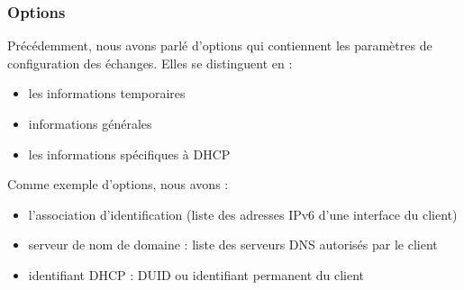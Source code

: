\subsubsection{Options}

Précédemment, nous avons parlé d’options qui contiennent les paramètres de configuration des échanges.  
Elles se distinguent en : 

\begin{itemize}
	\item les informations temporaires
	\item  informations générales
	\item les informations spécifiques à DHCP
\end{itemize}

Comme exemple d’options, nous avons :

\begin{itemize} 
	\item l’association d’identification (liste des adresses IPv6 d’une interface du client)
	\item serveur de nom de domaine : liste des serveurs DNS autorisés par le client 
	\item identifiant DHCP : DUID ou identifiant permanent du client
\end{itemize}



